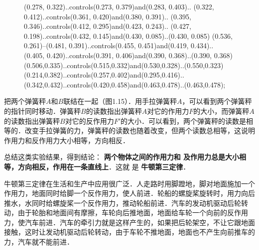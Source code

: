 \begin{figure}[H]
{\begin{scope}[#2,rotate=#1]
            (0.278, 0.322)..controls(0.273, 0.379)and(0.283, 0.403)..
            (0.322, 0.412)..controls(0.361, 0.420)and(0.380, 0.391)..
            (0.395, 0.346)..controls(0.412, 0.295)and(0.423, 0.243)..
            (0.427, 0.198)..controls(0.432, 0.145)and(0.430, 0.085)..(0.430, 0.085)
            (0.536, 0.261)--(0.481, 0.391)..controls(0.455, 0.451)and(0.419, 0.434)..
            (0.405, 0.420)..controls(0.391, 0.406)and(0.390, 0.368)..(0.390, 0.368)
            (0.506,0.335)..controls(0.515,0.332)and(0.530,0.328)..(0.550,0.323)
            (0.214,0.382)..controls(0.257,0.402)and(0.295,0.416)..
            (0.342,0.432)..controls(0.420,0.458)and(0.463,0.478)..(0.463,0.478);
        \end{scope}
    }
    \caption{}
\end{figure}

把两个弹簧秤$A$和$B$联结在一起（图1.15）．用手拉弹簧秤$A$，可以看到两个弹簧秤的指针同时移动．弹簧秤$B$的读数指出弹簧秤$A$对它的作用力$F$的大小，而弹簧秤$A$的读数指出弹簧秤$B$对它的反作用力$F'$的大小．可以看到，两个弹簧秤的读数是相等的．改变手拉弹簧的力，弹簧秤的读数也随着改变，但两个读数总相等，这说明作用力和反作用力大小相等，方向相反．

总结这类实验结果，得到结论：\textbf{ 两个物体之间的作用力和
    及作用力总是大小相等，方向相反，作用在一条直线上}．这就
是\textbf{ 牛顿第三定律}．

牛顿第三定律在生活和生产中应用很广泛．人走路时用脚蹬地，脚对地面施加一个作用力，地面同时给脚一个反作用力，使人前进．轮船的螺旋桨旋转时，用力向后推水，水同时给螺旋桨一个反作用力，推动轮船前进．汽车的发动机驱动后轮转动，由于轮胎和地面间有摩擦，车轮向后推地面，地面给车轮一个向前的反作用力，使汽车前进．汽车的牵引力就是这样产生的，如果把后轮架空，不让它跟地面接触，这时让发动机驱动后轮转动，由于车轮不推地面，地面也不产生向前推车的力，汽车就不能前进．

